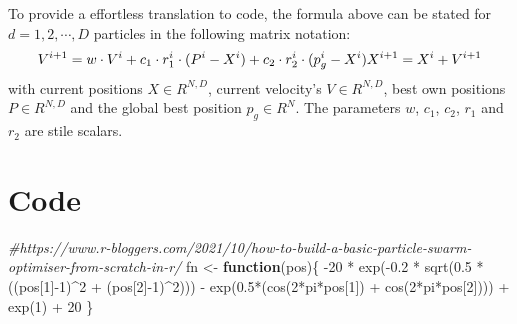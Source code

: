 \documentclass[
  oneside]{book}
\newenvironment{Shaded}{\begin{snugshade}}{\end{snugshade}}
\newcommand{\CommentTok}[1]{\textcolor[rgb]{0.56,0.35,0.01}{\textit{#1}}}
\newcommand{\ControlFlowTok}[1]{\textcolor[rgb]{0.13,0.29,0.53}{\textbf{#1}}}
\newcommand{\DecValTok}[1]{\textcolor[rgb]{0.00,0.00,0.81}{#1}}
\newcommand{\FloatTok}[1]{\textcolor[rgb]{0.00,0.00,0.81}{#1}}
\newcommand{\FunctionTok}[1]{\textcolor[rgb]{0.00,0.00,0.00}{#1}}
\newcommand{\NormalTok}[1]{#1}
\newcommand{\OtherTok}[1]{\textcolor[rgb]{0.56,0.35,0.01}{#1}}
\newcommand{\SpecialCharTok}[1]{\textcolor[rgb]{0.00,0.00,0.00}{#1}}
\begin{document}
To provide a effortless translation to code, the formula above can be stated for \(d = 1, 2, \cdots, D\) particles in the following matrix notation:
\[
  V^{i+1} = w \cdot V^{i} + c_1 \cdot r_1^i \cdot (P^i-X^i) + c_2 \cdot r_2^i \cdot (p_g^i - X^i) \\
  X^{i+1} = X^i + V^{i+1}
\]
with current positions \(X \in R^{N,D}\), current velocity's \(V \in R^{N,D}\), best own positions \(P \in R^{N,D}\) and the global best position \(p_g \in R^{N}\). The parameters \(w\), \(c_1\), \(c_2\), \(r_1\) and \(r_2\) are stile scalars.

\hypertarget{code}{%
\section{Code}\label{code}}

\begin{Shaded}
\begin{Highlighting}[]
\CommentTok{\#https://www.r{-}bloggers.com/2021/10/how{-}to{-}build{-}a{-}basic{-}particle{-}swarm{-}optimiser{-}from{-}scratch{-}in{-}r/}
\NormalTok{fn }\OtherTok{\textless{}{-}} \ControlFlowTok{function}\NormalTok{(pos)\{}
  \SpecialCharTok{{-}}\DecValTok{20} \SpecialCharTok{*} \FunctionTok{exp}\NormalTok{(}\SpecialCharTok{{-}}\FloatTok{0.2} \SpecialCharTok{*} \FunctionTok{sqrt}\NormalTok{(}\FloatTok{0.5} \SpecialCharTok{*}\NormalTok{((pos[}\DecValTok{1}\NormalTok{]}\SpecialCharTok{{-}}\DecValTok{1}\NormalTok{)}\SpecialCharTok{\^{}}\DecValTok{2} \SpecialCharTok{+}\NormalTok{ (pos[}\DecValTok{2}\NormalTok{]}\SpecialCharTok{{-}}\DecValTok{1}\NormalTok{)}\SpecialCharTok{\^{}}\DecValTok{2}\NormalTok{))) }\SpecialCharTok{{-}} \FunctionTok{exp}\NormalTok{(}\FloatTok{0.5}\SpecialCharTok{*}\NormalTok{(}\FunctionTok{cos}\NormalTok{(}\DecValTok{2}\SpecialCharTok{*}\NormalTok{pi}\SpecialCharTok{*}\NormalTok{pos[}\DecValTok{1}\NormalTok{]) }\SpecialCharTok{+} \FunctionTok{cos}\NormalTok{(}\DecValTok{2}\SpecialCharTok{*}\NormalTok{pi}\SpecialCharTok{*}\NormalTok{pos[}\DecValTok{2}\NormalTok{]))) }\SpecialCharTok{+} \FunctionTok{exp}\NormalTok{(}\DecValTok{1}\NormalTok{) }\SpecialCharTok{+} \DecValTok{20}
\NormalTok{\}}


\end{Highlighting}
\end{Shaded}
\end{document}

